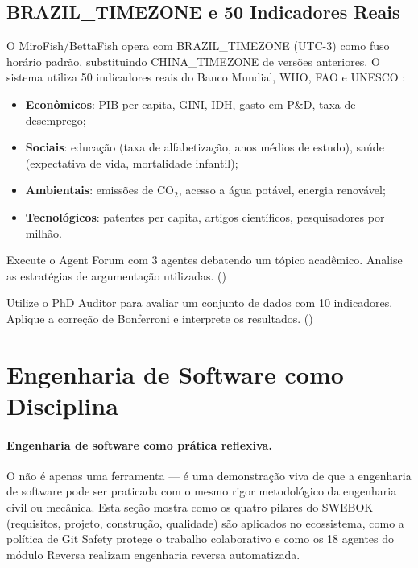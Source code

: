 \subsection{BRAZIL\_TIMEZONE e 50 Indicadores Reais}
\label{subsec:brazil-timezone}

O MiroFish/BettaFish opera com BRAZIL\_TIMEZONE (UTC-3) como fuso
horário padrão, substituindo CHINA\_TIMEZONE de versões anteriores.
O sistema utiliza 50 indicadores reais do Banco Mundial, WHO, FAO e
UNESCO \cite{laranjeira2026opencode}:

\begin{itemize}
\item \textbf{Econômicos}: PIB per capita, GINI, IDH, gasto em P\&D,
taxa de desemprego;
\item \textbf{Sociais}: educação (taxa de alfabetização, anos médios de
estudo), saúde (expectativa de vida, mortalidade infantil);
\item \textbf{Ambientais}: emissões de CO$_2$, acesso a água potável,
energia renovável;
\item \textbf{Tecnológicos}: patentes per capita, artigos científicos,
pesquisadores por milhão.
\end{itemize}

\begin{exercicio}
Execute o Agent Forum com 3 agentes debatendo um tópico acadêmico.
Analise as estratégias de argumentação utilizadas. (\nivelphd)
\end{exercicio}

\begin{exercicio}
Utilize o PhD Auditor para avaliar um conjunto de dados com 10
indicadores. Aplique a correção de Bonferroni e interprete os
resultados. (\nivelphd)
\end{exercicio}

\section{Engenharia de Software como Disciplina}
\label{sec:engenharia-software}
\nivelavancado

\paragraph{Engenharia de software como prática reflexiva.} O \opencodeeco{} não é apenas uma ferramenta — é uma demonstração viva de que a engenharia de software pode ser praticada com o mesmo rigor metodológico da engenharia civil ou mecânica. Esta seção mostra como os quatro pilares do SWEBOK (requisitos, projeto, construção, qualidade) são aplicados no ecossistema, como a política de Git Safety protege o trabalho colaborativo e como os 18 agentes do módulo Reversa realizam engenharia reversa automatizada.

